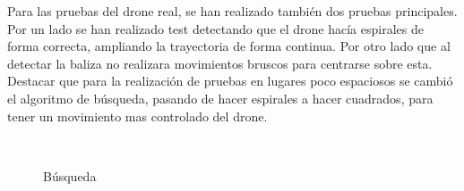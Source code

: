 \hspace{1cm} Para las pruebas del drone real, se han realizado tambi\'en dos pruebas principales. Por un lado se han realizado test detectando que el drone hac\'ia espirales de forma correcta, ampliando la trayectoria de forma continua. Por otro lado que al detectar la baliza no realizara movimientos bruscos para centrarse sobre esta. Destacar que para la realizaci\'on de pruebas en lugares poco espaciosos se cambi\'o el algoritmo de b\'usqueda, pasando de hacer espirales a hacer cuadrados, para tener un movimiento mas controlado del drone. 


\begin{figure}[H]
 \centering
	\\
 \caption{B\'usqueda}
 \label{f:Busqueda con el drone real}
\end{figure}


